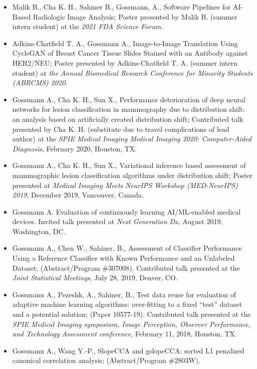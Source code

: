 \documentclass[overlapped, line, 10pt]{res} %
\begin{document}
\begin{resume}
\begin{itemize}
  \item
    Malik B., Cha K. H., Sahiner B., Gossmann, A., Software Pipelines for AI-Based Radiologic Image Analysis;
    Poster presented by Malik B. (summer intern student) at the \textit{2021 FDA Science Forum}.
  \item 
    Adkins-Chatfield T. A., Gossmann A., Image-to-Image Translation Using CycleGAN of Breast Cancer Tissue Slides Stained with an Antibody against HER2/NEU;
    Poster presented by Adkins-Chatfield T. A. (summer intern student) at \textit{the Annual Biomedical Research Conference for Minority Students (ABRCMS) 2020}.
  \item
    Gossmann A., Cha K. H., Sun X., Performance deterioration of deep neural networks for lesion classification in mammography due to distribution shift: an analysis based on artificially created distribution shift;
    Contributed talk presented by Cha K. H. (substitute due to travel complications of lead author) at the \textit{SPIE Medical Imaging Medical Imaging 2020: Computer-Aided Diagnosis},
    February 2020, Houston, TX.
  \item Gossmann A., Cha K. H., Sun X., Variational inference based assessment of mammographic lesion classification algorithms under distribution shift;
    Poster presented at \textit{Medical Imaging Meets NeurIPS Workshop (MED-NeurIPS) 2019},
    December 2019, Vancouver, Canada.
  \item
    Gossmann A. Evaluation of continuously learning AI/ML-enabled medical devices.
    Invited talk presented at \textit{Next Generation Dx},
    August 2019, Washington, DC.
  \item
    Gossmann A., Chen W., Sahiner, B., Assessment of Classifier Performance Using a Reference Classifier with Known Performance and an Unlabeled Dataset;
    (Abstract/Program \#307008).
    Contributed talk presented at the \textit{Joint Statistical Meetings},
    July 28, 2019, Denver, CO.
  \item
    Gossmann A., Pezeshk, A., Sahiner, B., Test data reuse for evaluation of adaptive machine learning algorithms: over-fitting to a fixed ``test'' dataset and a potential solution;
    (Paper 10577-19).
    Contributed talk presented at the \textit{SPIE Medical Imaging symposium, Image Perception, Observer Performance, and Technology Assessment conference},
    February 11, 2018, Houston, TX.
  \item
    Gossmann A., Wang Y.-P., SlopeCCA and gslopeCCA: sorted L1 penalized canonical correlation analysis;
    (Abstract/Program \#2803W).

\end{itemize}
\end{resume}
\end{document}
